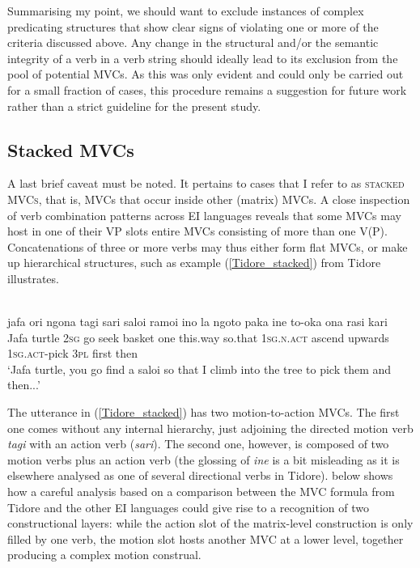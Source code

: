 Summarising my point, we should want to exclude instances of complex predicating structures that show clear signs of violating one or more of the criteria discussed above. Any change in the structural and/or the semantic integrity of a verb in a verb string should ideally lead to its exclusion from the pool of potential MVCs. As this was only evident and could only be carried out for a small fraction of cases, this procedure remains a suggestion for future work rather than a strict guideline for the present study.

\subsection{Stacked MVCs}\label{sec:stackedmvcs}

A last brief caveat must be noted. It pertains to cases that I refer to as \textsc{stacked MVCs}, that is, MVCs that occur inside other (matrix) MVCs. A close inspection of verb combination patterns across EI languages reveals that some MVCs may host in one of their VP slots entire MVCs consisting of more than one V(P). Concatenations of three or more verbs may thus either form flat MVCs, or make up hierarchical structures, such as example (\ref{Tidore_stacked}) from Tidore illustrates.

\ea \label{Tidore_stacked}
\\
\gll jafa ori ngona tagi sari saloi ramoi ino la ngoto paka ine to-oka ona rasi kari \\
Jafa turtle 2\textsc{sg} go seek basket one this.way so.that 1\textsc{sg}.\textsc{n}.\textsc{act} ascend upwards 1\textsc{sg}.\textsc{act}-pick 3\textsc{pl} first then \\
\glft `Jafa turtle, you go find a saloi so that I climb into the tree to pick them and then...' \\ 
\z

The utterance in (\ref{Tidore_stacked}) has two motion-to-action MVCs. The first one comes without any internal hierarchy, just adjoining the directed motion verb \textit{tagi} with an action verb (\textit{sari}). The second one, however, is composed of two motion verbs plus an action verb (the glossing of \textit{ine} is a bit misleading as it is elsewhere analysed as one of several directional verbs in Tidore).  below shows how a careful analysis based on a comparison between the MVC formula from Tidore and the other EI languages could give rise to a recognition of two constructional layers: while the action slot of the matrix-level construction is only filled by one verb, the motion slot hosts another MVC at a lower level, together producing a complex motion construal.  

